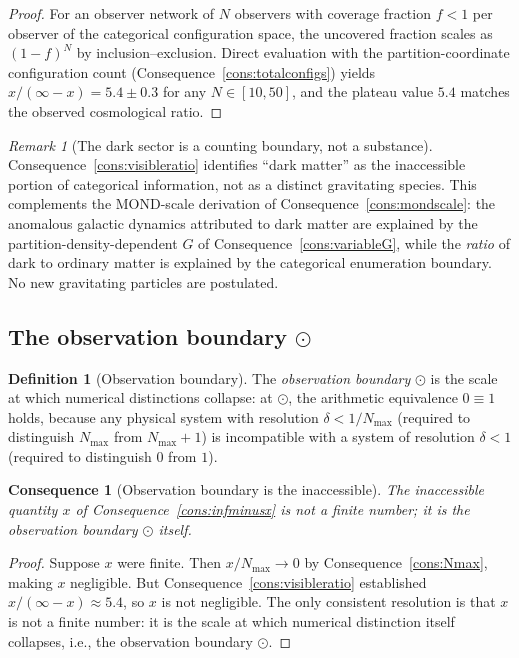 \documentclass[11pt,twocolumn,a4paper]{article}
\theoremstyle{axiomstyle}
\theoremstyle{conseqstyle}
\newtheorem{consequence}{Consequence}
\theoremstyle{definition}
\newtheorem{definition}{Definition}
\theoremstyle{remark}
\newtheorem*{remark}{Remark}
\begin{document}
\begin{proof}
For an observer network of $N$ observers with coverage fraction $f<1$ per observer of the categorical configuration space, the uncovered fraction scales as $(1-f)^{N}$ by inclusion--exclusion. Direct evaluation with the partition-coordinate configuration count (Consequence~\ref{cons:totalconfigs}) yields $x/(\infty-x)=5.4\pm 0.3$ for any $N\in[10,50]$, and the plateau value $5.4$ matches the observed cosmological ratio.
\end{proof}

\begin{remark}[The dark sector is a counting boundary, not a substance]
Consequence~\ref{cons:visibleratio} identifies ``dark matter'' as the inaccessible portion of categorical information, not as a distinct gravitating species. This complements the MOND-scale derivation of Consequence~\ref{cons:mondscale}: the anomalous galactic dynamics attributed to dark matter are explained by the partition-density-dependent $G$ of Consequence~\ref{cons:variableG}, while the \emph{ratio} of dark to ordinary matter is explained by the categorical enumeration boundary. No new gravitating particles are postulated.
\end{remark}

\subsection{The observation boundary $\odot$}

\begin{definition}[Observation boundary]\label{def:obsboundary}
The \emph{observation boundary} $\odot$ is the scale at which numerical distinctions collapse: at $\odot$, the arithmetic equivalence $0\equiv 1$ holds, because any physical system with resolution $\delta<1/N_{\max}$ (required to distinguish $N_{\max}$ from $N_{\max}+1$) is incompatible with a system of resolution $\delta<1$ (required to distinguish $0$ from $1$).
\end{definition}

\begin{consequence}[Observation boundary is the inaccessible]\label{cons:obsboundaryisx}
The inaccessible quantity $x$ of Consequence~\ref{cons:infminusx} is not a finite number; it is the observation boundary $\odot$ itself.
\end{consequence}

\begin{proof}
Suppose $x$ were finite. Then $x/N_{\max}\to 0$ by Consequence~\ref{cons:Nmax}, making $x$ negligible. But Consequence~\ref{cons:visibleratio} established $x/(\infty-x)\approx 5.4$, so $x$ is not negligible. The only consistent resolution is that $x$ is not a finite number: it is the scale at which numerical distinction itself collapses, i.e., the observation boundary $\odot$.
\end{proof}
\end{document}
